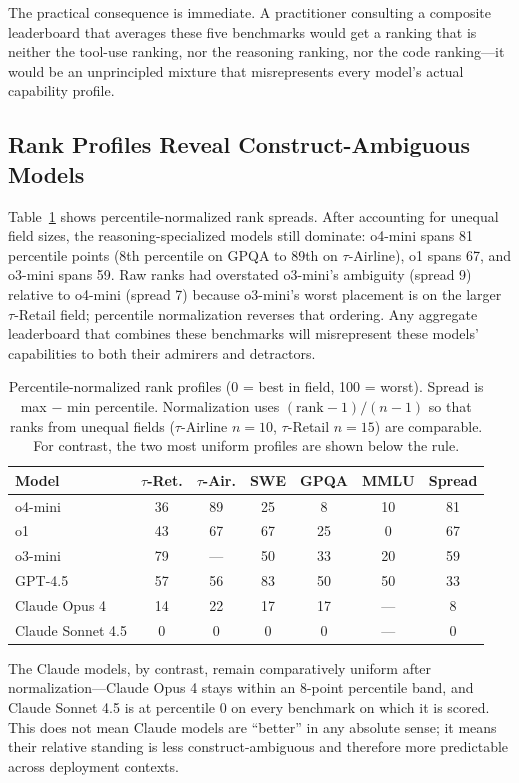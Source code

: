 \documentclass[11pt]{article}
\begin{document}
The practical consequence is immediate. A practitioner consulting a composite leaderboard that averages these five benchmarks would get a ranking that is neither the tool-use ranking, nor the reasoning ranking, nor the code ranking---it would be an unprincipled mixture that misrepresents every model's actual capability profile.

\subsection{Rank Profiles Reveal Construct-Ambiguous Models}
Table~\ref{tab:spread} shows percentile-normalized rank spreads. After accounting for unequal field sizes, the reasoning-specialized models still dominate: o4-mini spans 81 percentile points (8th percentile on GPQA to 89th on $\tau$-Airline), o1 spans 67, and o3-mini spans 59. Raw ranks had overstated o3-mini's ambiguity (spread 9) relative to o4-mini (spread 7) because o3-mini's worst placement is on the larger $\tau$-Retail field; percentile normalization reverses that ordering. Any aggregate leaderboard that combines these benchmarks will misrepresent these models' capabilities to both their admirers and detractors.

\begin{table}[t]
\caption{Percentile-normalized rank profiles (0 = best in field, 100 = worst). Spread is max $-$ min percentile. Normalization uses $(\mathrm{rank}-1)/(n-1)$ so that ranks from unequal fields ($\tau$-Airline $n{=}10$, $\tau$-Retail $n{=}15$) are comparable. For contrast, the two most uniform profiles are shown below the rule.}
\label{tab:spread}
\small
\setlength{\tabcolsep}{3.5pt}
\begin{tabular}{lcccccc}
\toprule
Model & $\tau$-Ret. & $\tau$-Air. & SWE & GPQA & MMLU & Spread \\
\midrule
o4-mini & 36 & 89 & 25 & 8 & 10 & 81 \\
o1 & 43 & 67 & 67 & 25 & 0 & 67 \\
o3-mini & 79 & --- & 50 & 33 & 20 & 59 \\
GPT-4.5 & 57 & 56 & 83 & 50 & 50 & 33 \\
\midrule
Claude Opus 4 & 14 & 22 & 17 & 17 & --- & 8 \\
Claude Sonnet 4.5 & 0 & 0 & 0 & 0 & --- & 0 \\
\bottomrule
\end{tabular}
\end{table}

The Claude models, by contrast, remain comparatively uniform after normalization---Claude Opus 4 stays within an 8-point percentile band, and Claude Sonnet 4.5 is at percentile 0 on every benchmark on which it is scored. This does not mean Claude models are ``better'' in any absolute sense; it means their relative standing is less construct-ambiguous and therefore more predictable across deployment contexts.
\end{document}
